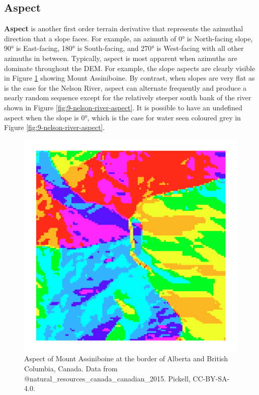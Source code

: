 \documentclass[
]{book}
\begin{document}
\hypertarget{aspect}{%
\subsection{Aspect}\label{aspect}}

\textbf{Aspect} is another first order terrain derivative that represents the azimuthal direction that a slope faces. For example, an azimuth of 0° is North-facing slope, 90° is East-facing, 180° is South-facing, and 270° is West-facing with all other azimuths in between. Typically, aspect is most apparent when azimuths are dominate throughout the DEM. For example, the slope aspects are clearly visible in Figure \ref{fig:9-mount-assiniboine-aspect} showing Mount Assiniboine. By contrast, when slopes are very flat as is the case for the Nelson River, aspect can alternate frequently and produce a nearly random sequence except for the relatively steeper south bank of the river shown in Figure \ref{fig:9-nelson-river-aspect}. It is possible to have an undefined aspect when the slope is 0°, which is the case for water seen coloured grey in Figure \ref{fig:9-nelson-river-aspect}.

\begin{figure}
\includegraphics[width=0.75\linewidth]{images/09-mount-assiniboine-aspect} \caption{Aspect of Mount Assiniboine at the border of Alberta and British Columbia, Canada. Data from @natural_resources_canada_canadian_2015. Pickell, CC-BY-SA-4.0.}\label{fig:9-mount-assiniboine-aspect}
\end{figure}
\end{document}
